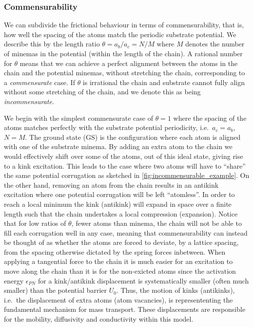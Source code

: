 \subsubsection{Commensurability} We can subdivide the frictional behaviour in terms of commensurability, that is, how well the spacing of the atoms match the periodic substrate potential. We describe this by the length ratio $\theta = a_b / a_c = N / M$ where $M$ denotes the number of minemas in the potential (within the length of the chain). A rational number for $\theta$ means that we can achieve a perfect alignment between the atoms in the chain and the potential minemas, without stretching the chain, corresponding to a \textit{commensurate} case. If $\theta$ is irrational the chain and substrate cannot fully align without some stretching of the chain, and we denote this as being \textit{incommensurate}.

We begin with the simplest commensurate case of $\theta = 1$ where the spacing
of the atoms matches perfectly with the substrate potential periodicity, i.e.\
$a_c = a_b$, $N = M$. The ground state (\acrshort{GS}) is the configuration
where each atom is aligned with one of the substrate minema. By adding an extra
atom to the chain we would effectively shift over some of the atoms, out of this
ideal state, giving rise to a kink excitation. This leads to the case where two
atoms will have to ``share'' the same potential corrugation as sketched in
\cref{fig:incommensurable_example}.  On the other hand, removing an atom from
the chain results in an antikink excitation where one potential corrugation will
be left ``atomless''. In order to reach a local minimum the kink (antikink) will
expand in space over a finite length such that the chain undertakes a local
compression (expansion). Notice that for low ratios of $\theta$, fewer atoms than minema, the chain will not be able to fill each corrugation well in any case, meaning that commensurability can instead be thought of as whether the atoms are forced to deviate, by a lattice spacing, from the spacing otherwise dictated by the spring forces inbetween. When applying a tangential force to the chain it is much
easier for an excitation to move along the chain than it is for the non-exicted
atoms since the activation energy $\epsilon_{PN}$ for a kink/antikink
displacement is systematically smaller (often much smaller) than the potential
barrier $U_0$. Thus, the motion of kinks (antikinks), i.e.\ the displacement of
extra atoms (atom vacancies), is represententing the fundamental mechanism for
mass transport. These displacements are responsible for the mobility,
diffusivity and conductivity within this model. 


